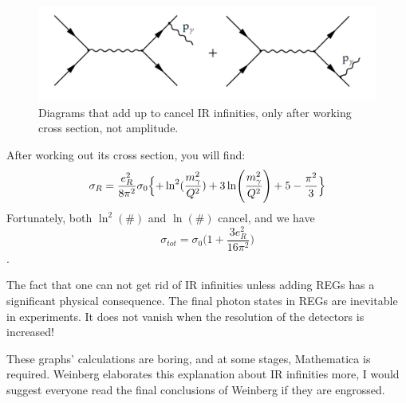 \documentclass[11pt]{article}
\begin{document}
\begin{problem}
\begin{figure}[H]
	\centering
	\includegraphics[width=0.75\linewidth]{img/10.png}
	\caption{Diagrams that add up to cancel IR infinities, only after working cross section, not amplitude.}
	\label{irdiv2}
\end{figure}
After working out its cross section, you will find:
\[
\sigma_R = \frac{e^2_R}{8\pi^2} \sigma_0 \Bigl\{+\ln^2(\frac{m_\gamma^2}{Q^2}) +3\ln (\frac{m^2_\gamma}{Q^2}) +5 - \frac{\pi^2}{3}\Bigr\}
\]
Fortunately, both $\ln^2(\#)$ and $\ln(\#)$ cancel, and we have 
\[
\sigma_{tot} = \sigma_0 \big(
1+ \frac{3e^2_R}{16\pi^2}
\big)
\].

The fact that one can not get rid of IR infinities unless adding REGs has a significant physical consequence. The final photon states in REGs are inevitable in experiments. It does not vanish when the resolution of the detectors is increased!

These graphs' calculations are boring, and at some stages, Mathematica is required. Weinberg elaborates this explanation about IR infinities more, I would suggest everyone read the final conclusions of Weinberg if they are engrossed.
\end{problem}
\end{document}
